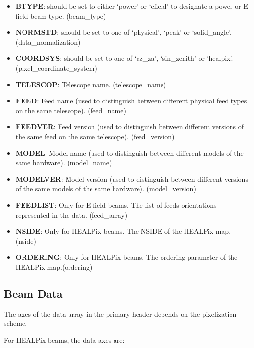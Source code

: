 \documentclass[11pt, oneside]{article}   	%
\begin{document}
\begin{itemize}
\item{\textbf{BTYPE}: should be set to either `power' or `efield' to designate a power or E-field beam type. (beam\_type)}
\item{\textbf{NORMSTD}: should be set to one of `physical', `peak' or `solid\_angle'. (data\_normalization)}
\item{\textbf{COORDSYS}: should be set to one of `az\_za', `sin\_zenith' or `healpix'. (pixel\_coordinate\_system)}
\item{\textbf{TELESCOP}: Telescope name. (telescope\_name)}
\item{\textbf{FEED}: Feed name (used to distinguish between different physical feed types on the same telescope). (feed\_name)}
\item{\textbf{FEEDVER}: Feed version (used to distinguish between different versions of the same feed on the same telescope). (feed\_version)}
\item{\textbf{MODEL}: Model name  (used to distinguish between different models of the same hardware). (model\_name)}
\item{\textbf{MODELVER}: Model version (used to distinguish between different versions of the same models of the same hardware). (model\_version)}
\item{\textbf{FEEDLIST}: Only for E-field beams. The list of feeds orientations represented in the data. (feed\_array)}
\item{\textbf{NSIDE}: Only for HEALPix beams. The NSIDE of the HEALPix map. (nside)}
\item{\textbf{ORDERING}: Only for HEALPix beams. The ordering parameter of the HEALPix map.(ordering)}
\end{itemize}

\subsection{Beam Data}
The axes of the data array in the primary header depends on the pixelization scheme.

For HEALPix beams, the data axes are:
\end{document}
